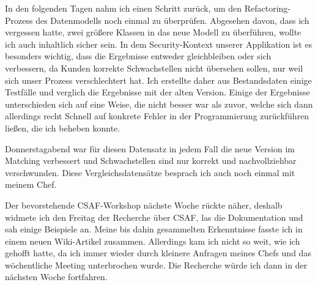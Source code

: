 \sweekdaymarginpar{\weekdayWednesdayShort, \weekdayThursdayShort}

In den folgenden Tagen nahm ich einen Schritt zurück, um den Refactoring-Prozess des Datenmodells noch einmal zu überprüfen.
Abgesehen davon, dass ich vergessen hatte, zwei größere Klassen in das neue Modell zu überführen, wollte ich auch inhaltlich sicher sein.
In dem Security-Kontext unserer Applikation ist es besonders wichtig, dass die Ergebnisse entweder gleichbleiben oder sich verbessern, da Kunden korrekte Schwachstellen nicht übersehen sollen, nur weil sich unser Prozess verschlechtert hat.
Ich erstellte daher aus Bestandsdaten einige Testfälle und verglich die Ergebnisse mit der alten Version.
Einige der Ergebnisse unterschieden sich auf eine Weise, die nicht besser war als zuvor, welche sich dann allerdings recht Schnell auf konkrete Fehler in der Programmierung zurückführen ließen, die ich beheben konnte.

Donnerstagabend war für diesen Datensatz in jedem Fall die neue Version im Matching verbessert und Schwachstellen sind nur korrekt und nachvollziehbar verschwunden.
Diese Vergleichsdatensätze besprach ich auch noch einmal mit meinem Chef.

\sweekdaymarginpar{\weekdayFridayLong}

Der bevorstehende CSAF-Workshop nächste Woche rückte näher, deshalb widmete ich den Freitag der Recherche über CSAF, las die Dokumentation und sah einige Beispiele an.
Meine bis dahin gesammelten Erkenntnisse fasste ich in einem neuen Wiki-Artikel zusammen.
Allerdings kam ich nicht so weit, wie ich gehofft hatte, da ich immer wieder durch kleinere Anfragen meines Chefs und das wöchentliche Meeting unterbrochen wurde.
Die Recherche würde ich dann in der nächsten Woche fortfahren.
